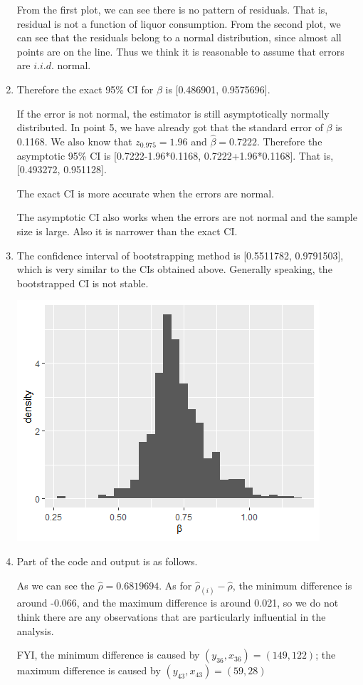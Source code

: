 \documentclass[11pt]{article}
\begin{document}
\begin{enumerate}
From the first plot, we can see there is no pattern of residuals. That is, residual is not a function of liquor consumption. From the second plot, we can see that the residuals belong to a normal distribution, since almost all points are on the line. Thus we think it is reasonable to assume that errors are $i.i.d.$ normal.

\item

Therefore the exact 95\% CI  for $\beta$ is [0.486901, 0.9575696]. \par
\vspace{0.4cm}
If the error is not normal, the estimator is still asymptotically normally distributed. In point 5, we have already got that the standard error of $\beta$ is 0.1168. We also know that $z_{0.975}=1.96$ and $\hat{\beta}=0.7222$. Therefore the asymptotic 95\% CI is [0.7222-1.96*0.1168, 0.7222+1.96*0.1168]. That is, [0.493272, 0.951128].

The exact CI is more accurate when the errors are normal. \par
The asymptotic CI also works when the errors are not normal and the sample size is large. Also it is narrower than the exact CI. 


\item
The confidence interval of bootstrapping method is [0.5511782, 0.9791503], which is very similar to the CIs obtained above. Generally speaking, the bootstrapped CI is not stable.
\begin{center}
  \includegraphics[width=0.7\linewidth]{Q4_10.png}
\end{center}

\item
Part of the code and output is as follows. 


As we can see the $\hat{\rho}=0.6819694$. As for $\hat{\rho}_{(i)}-\hat{\rho}$, the minimum difference is around -0.066, and the maximum difference is around 0.021, so we do not think there are any observations that are particularly influential in the analysis. \par
FYI, the minimum difference is caused by $(y_{36},x_{36}) = (149, 122)$; the maximum difference is caused by $(y_{43},x_{43}) = (59,28)$

\end{enumerate}
\end{document}
